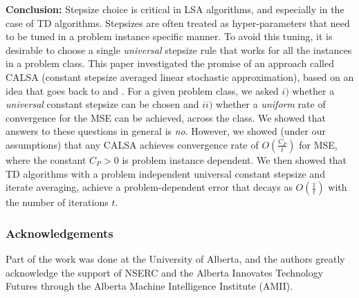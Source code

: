 \textbf{Conclusion:} 
Stepsize choice is critical in LSA algorithms, and especially in the case of TD algorithms.
Stepsizes are often treated as hyper-parameters that need to be tuned in a problem instance specific manner. To avoid this tuning, it is desirable to choose a single \emph{universal} stepsize rule that works for all the instances in a problem class. This paper investigated the promise of an approach called CALSA (constant stepsize averaged linear stochastic approximation), based on an idea that goes back to \citet{ruppert} and \citet{polyak-judisky}. For a given problem class, we asked $i)$ whether a \emph{universal} constant stepsize can be chosen and $ii)$ whether a \emph{uniform} rate of convergence for the MSE can be achieved, across the class. We showed that answers to these questions in general is \emph{no}. However, we showed (under our assumptions) that any CALSA achieves convergence rate of $O(\frac{C_P}{t})$ for MSE, where the constant $C_P>0$ is problem instance dependent. We then showed that TD algorithms with a problem independent universal constant stepsize and iterate averaging, achieve a problem-dependent error 
that decays as $O(\frac{1}{t})$ with the number of iterations $t$.
\subsubsection*{Acknowledgements}
Part of the work was done at the University of Alberta, and the authors greatly acknowledge the
support of NSERC and the Alberta Innovates Technology
Futures through the Alberta Machine Intelligence
Institute (AMII).